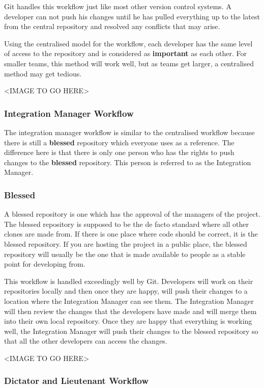 Git handles this workflow just like most other version control systems.  A developer can not push his changes until he has pulled everything up to the latest from the central repository and resolved any conflicts that may arise.

Using the centralised model for the workflow, each developer has the same level of access to the repository and is considered as \textbf{important} as each other.  For smaller teams, this method will work well, but as teams get larger, a centralised method may get tedious.

<IMAGE TO GO HERE>

\subsubsection*{Integration Manager Workflow}
The integration manager workflow is similar to the centralised workflow because there is still a \textbf{blessed} repository which everyone uses as a reference.  The difference here is that there is only one person who has the rights to push changes to the \textbf{blessed} repository.  This person is referred to as the Integration Manager.  

\subsubsection*{Blessed}

A blessed repository is one which has the approval of the managers of the project.  The blessed repository is supposed to be the de facto standard where all other clones are made from.  If there is one place where code should be correct, it is the blessed repository.  If you are hosting the project in a public place, the blessed repository will usually be the one that is made available to people as a stable point for developing from.

This workflow is handled exceedingly well by Git.  Developers will work on their repositories locally and then once they are happy, will push their changes to a location where the Integration Manager can see them.  The Integration Manager will then review the changes that the developers have made and will merge them into their own local repository.  Once they are happy that everything is working well, the Integration Manager will push their changes to the blessed repository so that all the other developers can access the changes.

<IMAGE TO GO HERE>

\subsubsection*{Dictator and Lieutenant Workflow}

